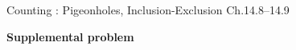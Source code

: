 \documentclass[handout]{mcs}
\begin{document}
\begin{staffnotes}
Counting : Pigeonholes, Inclusion-Exclusion Ch.14.8--14.9
\end{staffnotes}



\begin{center}
\textbf{\large Supplemental problem}
\end{center}


\end{document}
